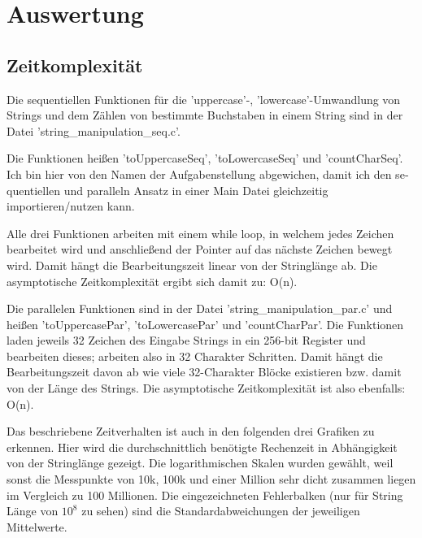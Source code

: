\documentclass[plainarticle,zihtitle,german,final,hyperref,utf8]{zihpub}
\begin{document}
\section{Auswertung}
\subsection{Zeitkomplexität}
Die se­quen­ti­ellen Funktionen für die 'uppercase'-, 'lowercase'-Umwandlung von Strings und dem Zählen von bestimmte Buchstaben in einem String sind in der Datei 'string\_manipulation\_seq.c'.

Die Funktionen heißen 'toUppercaseSeq', 'toLowercaseSeq' und 'countCharSeq'. Ich bin hier von den Namen der Aufgabenstellung abgewichen, damit ich den se­quen­ti­ellen und paralleln Ansatz in einer Main Datei gleichzeitig importieren/nutzen kann.

Alle drei Funktionen arbeiten mit einem while loop, in welchem jedes Zeichen bearbeitet wird und anschließend der Pointer auf das nächste Zeichen bewegt wird. Damit hängt die Bearbeitungszeit linear von der Stringlänge ab. Die asymptotische Zeitkomplexität ergibt sich damit zu: O(n).
\newline

Die parallelen Funktionen sind in der Datei 'string\_manipulation\_par.c' und heißen 'toUppercasePar', 'toLowercasePar' und 'countCharPar'.
Die Funktionen laden jeweils 32 Zeichen des Eingabe Strings in ein 256-bit Register und bearbeiten dieses; arbeiten also in 32 Charakter Schritten.
Damit hängt die Bearbeitungszeit davon ab wie viele 32-Charakter Blöcke existieren bzw. damit von der Länge des Strings. Die asymptotische Zeitkomplexität ist also ebenfalls: O(n).
\newline

Das beschriebene Zeitverhalten ist auch in den folgenden drei Grafiken zu erkennen.
Hier wird die durchschnittlich benötigte Rechenzeit in Abhängigkeit von der Stringlänge gezeigt.
Die logarithmischen Skalen wurden gewählt, weil sonst die Messpunkte von 10k, 100k und einer Million sehr dicht zusammen liegen im Vergleich zu 100 Millionen.
Die eingezeichneten Fehlerbalken (nur für String Länge von \begin{math}10^8\end{math} zu sehen) sind die Standardabweichungen der jeweiligen Mittelwerte.
\end{document}
